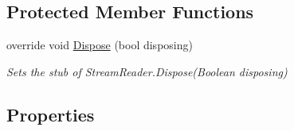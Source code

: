 \subsection*{Protected Member Functions}
\begin{DoxyCompactItemize}
\item 
override void \hyperlink{class_system_1_1_i_o_1_1_fakes_1_1_stub_stream_reader_a04064c66fb39fd509493785b255d2e79}{Dispose} (bool disposing)
\begin{DoxyCompactList}\small\item\em Sets the stub of Stream\-Reader.\-Dispose(\-Boolean disposing)\end{DoxyCompactList}\end{DoxyCompactItemize}
\subsection*{Properties}
